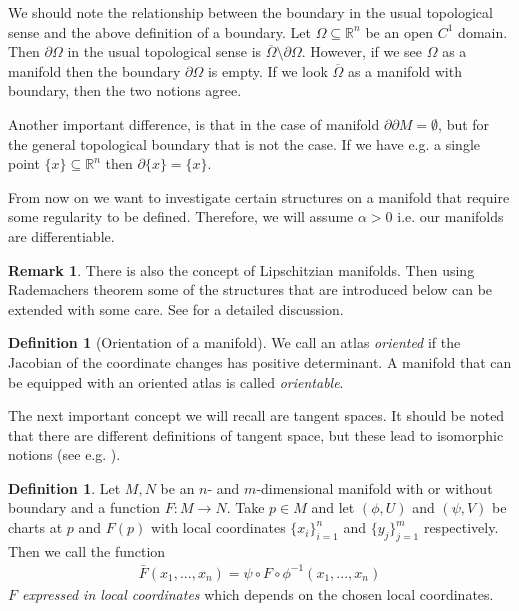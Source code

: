 \documentclass[12pt,a4paper]{article}
\numberwithin{equation}{subsection}
\numberwithin{lemma}{subsection}
\theoremstyle{definition}
\newtheorem{definition}[lemma]{Definition}
\newtheorem{remark}[lemma]{Remark}
\newcommand{\real}{\mathbb{R}}
\begin{document}
We should note the relationship between the boundary in the usual topological sense 
and the above definition of a boundary. Let $\Omega \subseteq \real^n$ be 
an open $C^1$ domain. Then $\partial \Omega$ in the usual topological sense 
is $\overline{\Omega} \setminus \partial \Omega$. However, if we see $\Omega$ 
as a manifold then the boundary $\partial \Omega$ is empty. If we look 
$\overline{\Omega}$ as a manifold with boundary, then the two notions agree.

Another important difference, is that in the case of manifold $\partial \partial M = \emptyset$,
but for the general topological boundary that is not the case. If we have e.g. a single 
point $\{ x \} \subseteq \real^n$ then $\partial \{x \} = \{ x \}$.

From now on we want to investigate certain structures on a manifold 
that require some regularity to be defined. Therefore, 
we will assume $\alpha > 0$ i.e. our manifolds are 
differentiable.

\begin{remark}
    There is also the concept of Lipschitzian manifolds. Then using Rademachers 
    theorem some of the structures that are introduced below can be extended 
    with some care. See \cite{lipschitz_manifolds} for a detailed discussion.
\end{remark}

\begin{definition}[Orientation of a manifold]
    We call an atlas \textit{oriented} if the Jacobian of the coordinate
    changes has positive determinant. A manifold that can be equipped with 
    an oriented atlas is called \textit{orientable}.
\end{definition}

The next important concept we will recall are tangent spaces. 
It should be noted that there are different definitions of tangent space, but
these lead to isomorphic notions 
(see e.g. \cite[Sec.\,1.B]{riemannian_geometry}).

\begin{definition}
    Let $M, N$ be an $n$- and $m$-dimensional manifold with or without boundary 
    and a function $F: M \rightarrow N$. Take $p \in M$ and let $(\phi, U)$ 
    and $(\psi,V)$ be charts at $p$ and $F(p)$ with local 
    coordinates $\{x_i\}_{i=1}^n$ and $\{y_j\}_{j=1}^m$ respectively. 
    Then we call the function 
    \begin{align*}
        \bar{F} (x_1,...,x_n) = \psi \circ F \circ \phi^{-1}(x_1,...,x_n)        
    \end{align*}
    \textit{$F$ expressed in local coordinates} which depends
    on the chosen local coordinates.
\end{definition}
\end{document}
